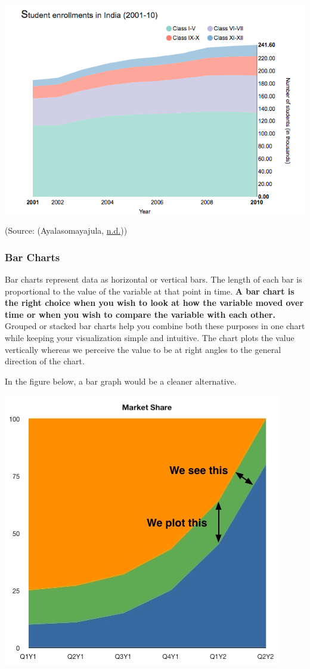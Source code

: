 \documentclass[]{book}
\begin{document}
\includegraphics{images/aya-stacked.png}

(Source: (Ayalasomayajula, \protect\hyperlink{ref-aya-time-series}{n.d.}))

\hypertarget{bar-charts}{%
\subsubsection{Bar Charts}\label{bar-charts}}

Bar charts represent data as horizontal or vertical bars. The length of each bar is proportional to the value of the variable at that point in time. \textbf{A bar chart is the right choice when you wish to look at how the variable moved over time or when you wish to compare the variable with each other.} Grouped or stacked bar charts help you combine both these purposes in one chart while keeping your visualization simple and intuitive. The chart plots the value vertically whereas we perceive the value to be at right angles to the general direction of the chart.

In the figure below, a bar graph would be a cleaner alternative.

\includegraphics{images/aya-stacked-perception_clear_graph.jpg}
\end{document}
